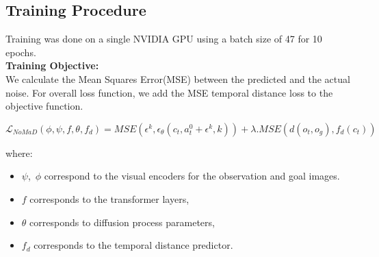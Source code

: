 \documentclass[12pt]{article}
\begin{document}
\subsection{Training Procedure}
Training was done on a single NVIDIA GPU using a batch size of 47 for 10 epochs.\\
\textbf{Training Objective:}\\
We calculate the Mean Squares Error(MSE) between  the predicted and the actual noise.
For overall loss function, we add the MSE temporal distance loss to the objective function.
\begin{center}
    \[ 
    \mathcal{L}_{NoMaD}(\phi,\psi,f,\theta,f_d) = MSE(\epsilon^{k}, \epsilon_{\theta}(c_t, a^{0}_t + \epsilon^{k},k)) + \lambda .MSE(d(o_t, o_g), f_{d}(c_t))
    \]
 \end{center}
 where:\\
 \begin{itemize}
     \item $\psi$,\ $\phi$ correspond to the visual encoders for the observation and goal images.
     \item $f$ corresponds to the transformer layers,
     \item $\theta$ corresponds to diffusion process parameters,
     \item $f_d$ corresponds to the temporal distance predictor.
 \end{itemize}
\end{document}
